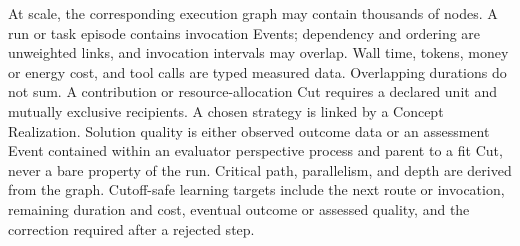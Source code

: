 \documentclass[10pt]{article}
\begin{document}
At scale, the corresponding execution graph may contain thousands of nodes. A
run or task episode contains invocation Events; dependency and ordering are
unweighted links, and invocation intervals may overlap. Wall time, tokens,
money or energy cost, and tool calls are typed measured data. Overlapping
durations do not sum. A contribution or resource-allocation Cut requires a
declared unit and mutually exclusive recipients. A chosen
strategy is linked by a Concept Realization. Solution quality is either observed
outcome data or an assessment Event contained within an evaluator perspective
process and parent to a fit Cut, never a bare
property of the run. Critical path, parallelism, and depth are derived from the
graph. Cutoff-safe learning targets include the next route or invocation,
remaining duration and cost, eventual outcome or assessed quality, and the
correction required after a rejected step.
\end{document}
